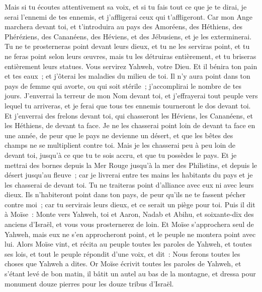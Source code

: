 \begin{multicols}{2}
Mais si tu écoutes attentivement sa voix, et si tu fais tout ce que je te dirai, je serai l'ennemi de tes ennemis, et j'affligerai ceux qui t'affligeront.
Car mon Ange marchera devant toi, et t'introduira au pays des Amoréens, des Héthiens, des Phéréziens, des Cananéens, des Héviens, et des Jébusiens, et je les exterminerai.
Tu ne te prosterneras point devant leurs dieux, et tu ne les serviras point, et tu ne feras point selon leurs œuvres, mais tu les détruiras entièrement, et tu briseras entièrement leurs statues.
Vous servirez Yahweh, votre Dieu. Et il bénira ton pain et tes eaux~; et j'ôterai les maladies du milieu de toi.
Il n'y aura point dans ton pays de femme qui avorte, ou qui soit stérile~; j'accomplirai le nombre de tes jours.
J'enverrai la terreur de mon Nom devant toi, et j'effrayerai tout peuple vers lequel tu arriveras, et je ferai que tous tes ennemis tourneront le dos devant toi.
Et j'enverrai des frelons devant toi, qui chasseront les Héviens, les Cananéens, et les Héthiens, de devant ta face.
Je ne les chasserai point loin de devant ta face en une année, de peur que le pays ne devienne un désert, et que les bêtes des champs ne se multiplient contre toi.
Mais je les chasserai peu à peu loin de devant toi, jusqu'à ce que tu te sois accru, et que tu possèdes le pays.
Et je mettrai des bornes depuis la Mer Rouge jusqu'à la mer des Philistins, et depuis le désert jusqu'au fleuve~; car je livrerai entre tes mains les habitants du pays et je les chasserai de devant toi.
Tu ne traiteras point d'alliance avec eux ni avec leurs dieux.
Ils n'habiteront point dans ton pays, de peur qu'ils ne te fassent pécher contre moi~; car tu servirais leurs dieux, et ce serait un piège pour toi.
\VerseOne{}Puis il dit à Moïse~: Monte vers Yahweh, toi et Aaron, Nadab et Abihu, et soixante-dix des anciens d'Israël, et vous vous prosternerez de loin.
Et Moïse s'approchera seul de Yahweh, mais eux ne s'en approcheront point, et le peuple ne montera point avec lui.
Alors Moïse vint, et récita au peuple toutes les paroles de Yahweh, et toutes ses lois, et tout le peuple répondit d'une voix, et dit~: Nous ferons toutes les choses que Yahweh a dites.
Or Moïse écrivit toutes les paroles de Yahweh, et s'étant levé de bon matin, il bâtit un autel au bas de la montagne, et dressa pour monument douze pierres pour les douze tribus d'Israël.

\end{multicols}
